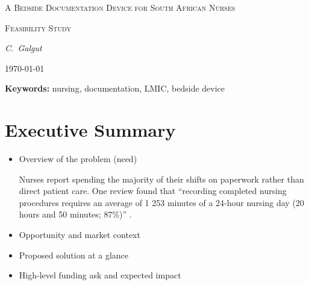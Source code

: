 \documentclass[a4paper,11pt]{article}
\begin{document}
\begin{titlepage}
  \centering
  \vspace*{1cm}
  {\scshape\LARGE A Bedside Documentation Device for South African Nurses\par}
  \vspace{1cm}
  {\scshape\Large Feasibility Study\par}
  \vfill
  {\Large\itshape C.\ Galgut \par}
  \vspace{2cm}
  {\large \today\par}
\end{titlepage}

\newpage
\begin{abstract}
\end{abstract}

\textbf{Keywords:} nursing, documentation, LMIC, bedside device

\newpage
\tableofcontents
\listoftables
\listoffigures

\newpage
{}

\section{Executive Summary}
\begin{itemize}
  \item Overview of the problem (need)
  
    Nurses report spending the majority of their shifts on paperwork rather than direct patient care. One review found that “recording completed nursing procedures requires an average of 1 253 minutes of a 24‑hour nursing day (20 hours and 50 minutes; 87\%)” \cite{olivierRecordKeepingSelfreported2010}.
    
  \item Opportunity and market context
  \item Proposed solution at a glance
  \item High‑level funding ask and expected impact
\end{itemize}
\end{document}
